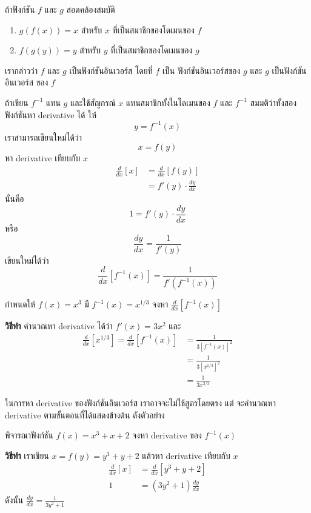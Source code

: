 \documentclass[
]{book}
\begin{document}
ถ้าฟังก์ชัน \(f\) และ \(g\) สอดคล้องสมบัติ

\begin{enumerate}
\def\labelenumi{\arabic{enumi}.}
\item
  \(g(f(x)) = x\) สำหรับ \(x\) ที่เป็นสมาชิกของโดเมนของ \(f\)
\item
  \(f(g(y)) = y\) สำหรับ \(y\) ที่เป็นสมาชิกของโดเมนของ \(g\)
\end{enumerate}

เรากล่าวว่า \(f\) และ \(g\) เป็นฟังก์ชันอินเวอร์ส โดยที่ \(f\) เป็น ฟังก์ชันอินเวอร์สของ
\(g\) และ \(g\) เป็นฟังก์ชันอินเวอร์ส ของ \(f\)

ถ้าเขียน \(f^{-1}\) แทน \(g\) และใช้สัญกรณ์ \(x\) แทนสมาชิกทั้งในโดเมนของ \(f\)
และ \(f^{-1}\) สมมติว่าทั้งสองฟังก์ชันหา derivative ได้ ให้ \[y = f^{-1}(x)\]
เราสามารถเขียนใหม่ได้ว่า \[x = f(y)\] หา derivative เทียบกับ \(x\)
\begin{equation}   \begin{aligned}
    \frac{d}{dx}[x]
    &= \frac{d}{dx}[f(y)] \\
    &= f'(y) \cdot \frac{dy}{dx}
  \end{aligned} \end{equation} นั่นคือ \[1 = f'(y) \cdot \frac{dy}{dx}\]
หรือ \[\frac{dy}{dx} = \frac{1}{f'(y)}\] เขียนใหม่ได้ว่า \[\label{E:inverse}
\boxed{
    \frac{d}{dx}[f^{-1}(x)] = \frac{1}{f'(f^{-1}(x))}
}\]

กำหนดให้ \(f(x) = x^3\) มี \(f^{-1}(x) = x^{1/3}\) จงหา
\(\frac{d}{dx} [f^{-1}(x)]\)

\textbf{วิธีทำ} คำนวณหา derivative ได้ว่า \(f'(x) = 3x^2\) และ
\begin{equation}   \begin{aligned}
    \frac{d}{dx} [x^{1/3}]  = \frac{d}{dx} [f^{-1}(x)]
    &= \frac{1}{3[f^{-1}(x)]^2} \\
    &= \frac{1}{3[x^{1/3}]^2} \\
    &= \frac{1}{3x^{2/3}}
  \end{aligned} \end{equation}

ในการหา derivative ของฟังก์ชันอินเวอร์ส เราอาจจะไม่ใช้สูตรโดยตรง แต่ จะคำนวณหา
derivative ตามขั้นตอนที่ได้แสดงข้างต้น ดังตัวอย่าง

พิจารณาฟังก์ชัน \(f(x) = x^3+x+2\) จงหา derivative ของ \(f^{-1}(x)\)

\textbf{วิธีทำ} เราเขียน \(x = f(y) = y^3+y+2\) แล้วหา derivative เทียบกับ
\(x\) \begin{equation}   \begin{aligned}
    \frac{d}{dx}[x]  &= \frac{d}{dx}[y^3+y+2] \\
    1 &= (3y^2+1)\frac{dy}{dx}
  \end{aligned} \end{equation} ดังนั้น
\(\displaystyle \frac{dy}{dx} = \frac{1}{3y^2+1}\)
\end{document}
